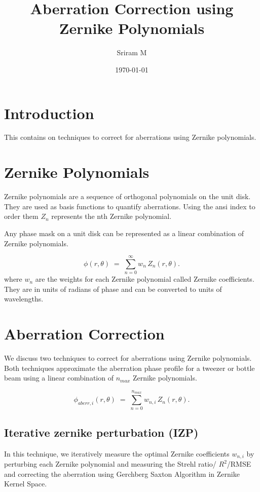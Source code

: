 \documentclass[11pt]{article}
\title{Aberration Correction using Zernike Polynomials}
\author{Sriram M}
\date{\today}
\begin{document}
\maketitle

\section{Introduction}

This contains on techniques to correct for aberrations using Zernike polynomials.

\section{Zernike Polynomials}   
Zernike polynomials are a sequence of orthogonal polynomials on the unit disk. They are used as basis functions to quantify aberrations.
Using the ansi index to order them  ${Z_n}$ represents the nth Zernike polynomial.

Any phase mask on a unit disk can be represented as a linear combination of Zernike polynomials.

\begin{equation}
    \phi(r,\theta) \;=\; \sum_{n=0}^{\infty} w_n \, Z_n(r,\theta).
\end{equation}
where \(w_n\) are the weights for each Zernike polynomial called Zernike coefficients. They are in units of radians of phase and can be converted to units of wavelengths.

\section{Aberration Correction}
We discuss two techniques to correct for aberrations using Zernike polynomials. 
Both techniques approximate the aberration phase profile for a tweezer or bottle beam using a linear combination of $n_{max}$ Zernike polynomials.

\begin{equation}
    \phi_{aberr,i}(r,\theta) \;=\; \sum_{n=0}^{n_{max}} w_{n,i} \, Z_n(r,\theta).
\end{equation}

\subsection{Iterative zernike perturbation (IZP)}
In this technique, we iteratively measure the optimal Zernike coefficients $w_{n,i}$ by perturbing each Zernike polynomial and measuring the Strehl ratio/ $R^2$/RMSE and correcting the aberration using Gerchberg Saxton Algorithm in Zernike Kernel Space.
\end{document}

